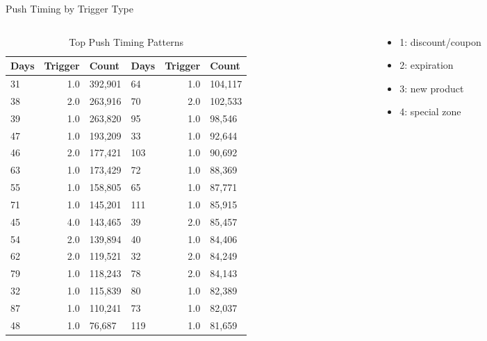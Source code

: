 \documentclass[aspectratio=169]{beamer}  %
\begin{document}
\begin{frame}{Push Timing by Trigger Type}
\begin{columns}
    \begin{column}{0.6\linewidth}
        \begin{table}[h]
\centering
\caption{Top Push Timing Patterns}
\label{tab:push_timing_compact}
\tiny
\begin{tabular}{lrl|lrl}
\toprule
\textbf{Days} & \textbf{Trigger} & \textbf{Count} & \textbf{Days} & \textbf{Trigger} & \textbf{Count} \\
\midrule
31 & 1.0 & 392,901 & 64 & 1.0 & 104,117 \\
38 & 2.0 & 263,916 & 70 & 2.0 & 102,533 \\
39 & 1.0 & 263,820 & 95 & 1.0 & 98,546 \\
47 & 1.0 & 193,209 & 33 & 1.0 & 92,644 \\
46 & 2.0 & 177,421 & 103 & 1.0 & 90,692 \\
63 & 1.0 & 173,429 & 72 & 1.0 & 88,369 \\
55 & 1.0 & 158,805 & 65 & 1.0 & 87,771 \\
71 & 1.0 & 145,201 & 111 & 1.0 & 85,915 \\
45 & 4.0 & 143,465 & 39 & 2.0 & 85,457 \\
54 & 2.0 & 139,894 & 40 & 1.0 & 84,406 \\
62 & 2.0 & 119,521 & 32 & 2.0 & 84,249 \\
79 & 1.0 & 118,243 & 78 & 2.0 & 84,143 \\
32 & 1.0 & 115,839 & 80 & 1.0 & 82,389 \\
87 & 1.0 & 110,241 & 73 & 1.0 & 82,037 \\
48 & 1.0 & 76,687 & 119 & 1.0 & 81,659 \\
\bottomrule
\end{tabular}
\end{table}
    \end{column}
\hspace{-2cm}
    
\begin{column}{0.3\linewidth}
    \begin{itemize}
        \item 1: discount/coupon
        \item 2: expiration
        \item 3: new product
        \item 4: special zone
    \end{itemize}
\end{column}
\end{columns}
\end{frame}
\end{document}

